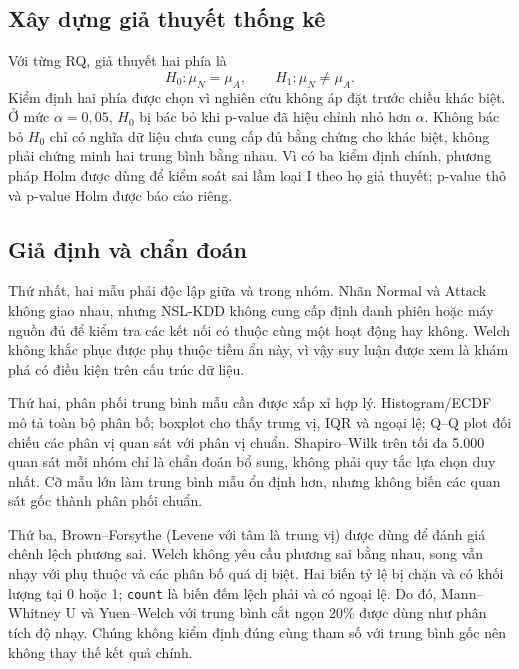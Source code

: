 \subsection{Xây dựng giả thuyết thống kê}
\label{subsec:two-sample-hypotheses}

Với từng RQ, giả thuyết hai phía là
\begin{equation}
  H_0:\mu_N=\mu_A,
  \qquad
  H_1:\mu_N\ne\mu_A.
  \label{eq:two-sample-hypotheses}
\end{equation}
Kiểm định hai phía được chọn vì nghiên cứu không áp đặt trước chiều khác biệt. Ở mức
$\alpha=0{,}05$, $H_0$ bị bác bỏ khi p-value đã hiệu chỉnh nhỏ hơn $\alpha$. Không
bác bỏ $H_0$ chỉ có nghĩa dữ liệu chưa cung cấp đủ bằng chứng cho khác biệt, không phải
chứng minh hai trung bình bằng nhau. Vì có ba kiểm định chính, phương pháp Holm được
dùng để kiểm soát sai lầm loại I theo họ giả thuyết; p-value thô và p-value Holm được
báo cáo riêng.

\subsection{Giả định và chẩn đoán}
\label{subsec:two-sample-assumptions}

Thứ nhất, hai mẫu phải độc lập giữa và trong nhóm. Nhãn Normal và Attack không giao
nhau, nhưng NSL-KDD không cung cấp định danh phiên hoặc máy nguồn đủ để kiểm tra các
kết nối có thuộc cùng một hoạt động hay không. Welch không khắc phục được phụ thuộc
tiềm ẩn này, vì vậy suy luận được xem là khám phá có điều kiện trên cấu trúc dữ liệu.

Thứ hai, phân phối trung bình mẫu cần được xấp xỉ hợp lý. Histogram/ECDF mô tả toàn bộ
phân bố; boxplot cho thấy trung vị, IQR và ngoại lệ; Q--Q plot đối chiếu các phân vị
quan sát với phân vị chuẩn. Shapiro--Wilk trên tối đa 5.000 quan sát mỗi nhóm chỉ là
chẩn đoán bổ sung, không phải quy tắc lựa chọn duy nhất. Cỡ mẫu lớn làm trung bình mẫu
ổn định hơn, nhưng không biến các quan sát gốc thành phân phối chuẩn.

Thứ ba, Brown--Forsythe (Levene với tâm là trung vị) được dùng để đánh giá chênh lệch
phương sai. Welch không yêu cầu phương sai bằng nhau, song vẫn nhạy với phụ thuộc và
các phân bố quá dị biệt. Hai biến tỷ lệ bị chặn và có khối lượng tại 0 hoặc 1;
\texttt{count} là biến đếm lệch phải và có ngoại lệ. Do đó, Mann--Whitney U và
Yuen--Welch với trung bình cắt ngọn 20\% được dùng như phân tích độ nhạy. Chúng không
kiểm định đúng cùng tham số với trung bình gốc nên không thay thế kết quả chính.

